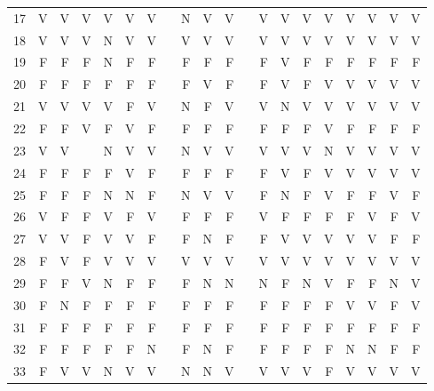 \begin{apendicesenv}
\begin{center}
\begin{tabular}{ l r r r r r r r r r r r r r r r r r r r}
	17	&	V	&	V	&	V	&	V	&	V	&	V	&       &	N	&	V	&	V	&       &	V	&	V	&	V	&	V	&	V	&	V	&	V	&	V	\\
	18	&	V	&	V	&	V	&	N	&	V	&	V	&       &	V	&	V	&	V	&       &	V	&	V	&	V	&	V	&	V	&	V	&	V	&	V	\\
	19	&	F	&	F	&	F	&	N	&	F	&	F	&       &	F	&	F	&	F	&       &	F	&	V	&	F	&	F	&	F	&	F	&	F	&	F	\\
	20	&	F	&	F	&	F	&	F	&	F	&	F	&       &	F	&	V	&	F	&       &	F	&	V	&	F	&	V	&	V	&	V	&	V	&	V	\\
	21	&	V	&	V	&	V	&	V	&	F	&	V	&       &	N	&	F	&	V	&       &	V	&	N	&	V	&	V	&	V	&	V	&	V	&	V	\\
	22	&	F	&	F	&	V	&	F	&	V	&	F	&       &	F	&	F	&	F	&       &	F	&	F	&	F	&	V	&	F	&	F	&	F	&	F	\\
	23	&	V	&	V	&		&	N	&	V	&	V	&       &	N	&	V	&	V	&       &	V	&	V	&	V	&	N	&	V	&	V	&	V	&	V	\\
	24	&	F	&	F	&	F	&	F	&	V	&	F	&       &	F	&	F	&	F	&       &	F	&	V	&	F	&	V	&	V	&	V	&	V	&	V	\\
	25	&	F	&	F	&	F	&	N	&	N	&	F	&       &	N	&	V	&	V	&       &	F	&	N	&	F	&	V	&	F	&	F	&	V	&	F	\\
	26	&	V	&	F	&	F	&	V	&	F	&	V	&       &	F	&	F	&	F	&       &	V	&	F	&	F	&	F	&	F	&	V	&	F	&	V	\\
	27	&	V	&	V	&	F	&	V	&	V	&	F	&       &	F	&	N	&	F	&       &	F	&	V	&	V	&	V	&	V	&	V	&	F	&	F	\\
	28	&	F	&	V	&	F	&	V	&	V	&	V	&       &	V	&	V	&	V	&       &	V	&	V	&	V	&	V	&	V	&	V	&	V	&	V	\\
	29	&	F	&	F	&	V	&	N	&	F	&	F	&       &	F	&	N	&	N	&       &	N	&	F	&	N	&	V	&	F	&	F	&	N	&	V	\\
	30	&	F	&	N	&	F	&	F	&	F	&	F	&       &	F	&	F	&	F	&       &	F	&	F	&	F	&	F	&	V	&	V	&	F	&	V	\\
	31	&	F	&	F	&	F	&	F	&	F	&	F	&       &	F	&	F	&	F	&       &	F	&	F	&	F	&	F	&	F	&	F	&	F	&	F	\\
	32	&	F	&	F	&	F	&	F	&	F	&	N	&       &	F	&	N	&	F	&       &	F	&	F	&	F	&	F	&	N	&	N	&	F	&	F	\\
	33	&	F	&	V	&	V	&	N	&	V	&	V	&       &	N	&	N	&	V	&       &	V	&	V	&	V	&	F	&	V	&	V	&	V	&	V	\\
	
	\hline
	\bottomrule
	\end{tabular}
\end{center}


\end{apendicesenv}
